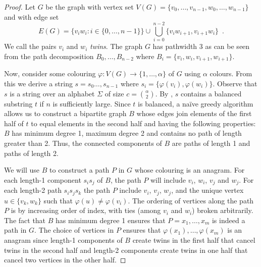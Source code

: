 \documentclass{patmorin}
\begin{document}
\begin{proof}
Let $G$ be the graph with vertex set
$V(G)=\{v_0,\ldots,v_{n-1},w_0,\ldots,w_{n-1}\}$ and with edge set
\[
  E(G) = \{v_iw_i : i\in\{0,\ldots,n-1\}\} \cup \bigcup_{i=0}^{n-2} \{v_iw_{i+1},v_{i+1}w_i\} \enspace .
\]
We call the pairs $v_i$ and $w_i$ \emph{twins}.
The graph $G$ has pathwidth 3 as can be seen from the path decomposition $B_0,\ldots,B_{n-2}$ where $B_i=\{v_i,w_i,v_{i+1},w_{i+1}\}$.

Now, consider some colouring $\varphi:V(G)\to\{1,\ldots,\alpha\}$ of $G$
using $\alpha$ colours. From this we derive a string $s=s_0\ldots,s_{n-1}$
where $s_i=\{\varphi(v_i),\varphi(w_i)\}$.  Observe that $s$ is
a string over an alphabet $\Sigma$ of size $c=\binom{\alpha}{2}$.
By , $s$ contains a balanced substring $t$ if $n$
is sufficiently large.  Since $t$
is balanced, a na\"ive greedy algorithm allows us to construct a bipartite
 graph $B$ whose edges join
elements of the first half of $t$ to equal elements in the second half
and having the following properties: $B$ has minimum degree 1, maximum
degree 2 and contains no path of length greater than 2.  Thus, the
connected components of $B$ are paths of length 1 and paths of length 2.

We will use $B$ to construct a path $P$ in $G$ whose colouring is an
anagram.  For each length-1 component $s_is_j$ of $B$, the path $P$
will include $v_i$, $w_i$, $v_j$ and $w_j$.  For each length-2 path
$s_is_js_k$ the path $P$ include $v_i$, $v_j$, $w_j$, and the unique
vertex $u\in\{v_k,w_k\}$ such that $\varphi(u)\neq \varphi(v_i)$.
The ordering of vertices along the path $P$ is by increasing order
of index, with ties (among $v_i$ and $w_i$) broken arbitrarily.
The fact that $B$ has minimum degree 1 ensures that $P=x_1,\ldots,x_m$
is indeed a path in $G$.  The choice of vertices in $P$ ensures that
$\varphi(x_1),\ldots,\varphi(x_m)$ is an anagram since length-1 components
of $B$ create twins in the first half that cancel twins in the second
half and length-2 components create twins in one half that cancel two
vertices in the other half.
\end{proof}
\end{document}
